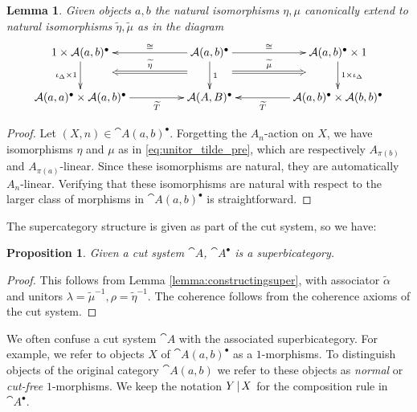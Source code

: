 \documentclass[english,letter paper,12pt,leqno]{article}
\newtheorem{proposition}[theorem]{Proposition}
\newtheorem{lemma}[theorem]{Lemma}
\theoremstyle{example}
\numberwithin{equation}{section}
\begin{document}
\begin{lemma} Given objects $a,b$ the natural isomorphisms $\eta, \mu$ canonically extend to natural isomorphisms $\widetilde{\eta}, \widetilde{\mu}$ as in the diagram
\[
\xymatrix@C+2pc{
1 \times \cat{A}(a,b)^\bullet \ar[d]_-{\iota_{\Delta} \times 1} & \cat{A}(a,b)^\bullet \ar@{=>}@<4ex>[l]_-{\widetilde{\eta}} \ar@{=>}@<-4ex>[r]^-{\widetilde{\mu}} \ar[d]^-{1} \ar[l]_-{\cong} \ar[r]^-{\cong} & \cat{A}(a,b)^\bullet \times 1 \ar[d]^-{1 \times \iota_{\Delta}}\\
\cat{A}(a,a)^\bullet \times \cat{A}(a,b)^\bullet \ar[r]_-{\widetilde{T}} & \cat{A}(A,B)^\bullet & \cat{A}(a,b)^\bullet \times \cat{A}(b,b)^\bullet \ar[l]^-{\widetilde{T}}
}
\]
 \end{lemma}
\begin{proof}
Let $(X,n) \in \cat{A}(a,b)^\bullet$. Forgetting the $A_n$-action on $X$, we have isomorphisms $\eta$ and $\mu$ as in \eqref{eq:unitor_tilde_pre}, which are respectively $A_{\pi(b)}$ and $A_{\pi(a)}$-linear. Since these isomorphisms are natural, they are automatically $A_n$-linear. Verifying that these isomorphisms are natural with respect to the larger class of morphisms in $\cat{A}(a,b)^\bullet$ is straightforward.
\end{proof}

The supercategory structure is given as part of the cut system, so we have:

\begin{proposition} Given a cut system $\cat{A}$, $\cat{A}^\bullet$ is a superbicategory.
\end{proposition}
\begin{proof}
This follows from Lemma \ref{lemma:constructingsuper}, with associator $\widetilde{\alpha}$ and unitors $\lambda =\widetilde{\mu}^{-1}, \rho = \widetilde{\eta}^{-1}$. The coherence follows from the coherence axioms of the cut system.
\end{proof}

We often confuse a cut system $\cat{A}$ with the associated superbicategory. For example, we refer to objects $X$ of $\cat{A}(a,b)^\bullet$ as a $1$-morphisms. To distinguish objects of the original category $\cat{A}(a,b)$ we refer to these objects as \emph{normal} or \emph{cut-free} $1$-morphisms. We keep the notation $Y \,|\, X$ for the composition rule in $\cat{A}^\bullet$.
\end{document}
